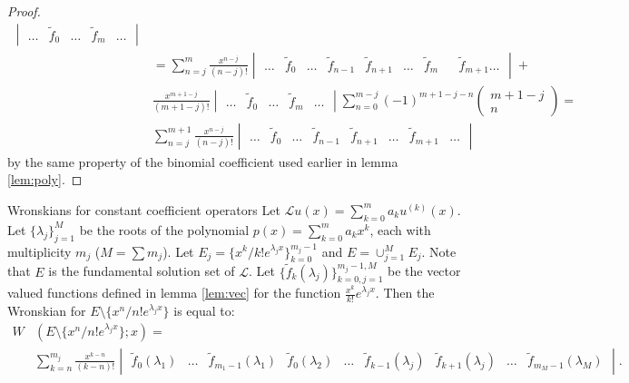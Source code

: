 \documentclass{book}
\begin{document}
\begin{proof}
\begin{align*}
\begin{vmatrix} \dots & \tilde{f}_0 & \dots & \tilde{f}_m & \dots \end{vmatrix} \\
& = \sum_{n=j}^m \frac{x^{n-j}}{(n-j)!} \begin{vmatrix} \dots & \tilde{f}_0 & \dots & \tilde{f}_{n-1} & \tilde{f}_{n+1} & \dots & \tilde{f}_m & & \tilde{f}_{m+1} \dots \end{vmatrix} + \\
& \frac{x^{m+1-j}}{(m+1-j)!}
\begin{vmatrix} \dots & \tilde{f}_0 & \dots & \tilde{f}_m & \dots \end{vmatrix}
\sum_{n=0}^{m-j} (-1)^{m+1-j-n} \begin{pmatrix} m+1-j \\ n \end{pmatrix} = \\
& \sum_{n=j}^{m+1} \frac{x^{n-j}}{(n-j)!} \begin{vmatrix} \dots & \tilde{f}_0 & \dots & \tilde{f}_{n-1} & \tilde{f}_{n+1} & \dots & \tilde{f}_{m+1} & \dots \end{vmatrix}
\end{align*}
by the same property of the binomial coefficient used earlier in lemma \ref{lem:poly}.
\end{proof}

\begin{thm}{Wronskians for constant coefficient operators}
Let $\mathcal{L} u(x) = \sum_{k=0}^m a_k u^{(k)}(x)$.
Let $\{ \lambda_j \}_{j=1}^M$ be the roots of the polynomial $p(x) = \sum_{k=0}^m a_k x^k$, each with multiplicity $m_j$ ($M = \sum m_j$).
Let $E_j = \{ x^k/k! e^{\lambda_j x} \}_{k=0}^{m_j-1}$ and $E = \cup_{j=1}^M E_j$.
Note that $E$ is the fundamental solution set of $\mathcal{L}$.
Let $\{ \tilde{f}_k(\lambda_j) \}_{k=0,j=1}^{m_j-1,M}$ be the vector valued functions defined in lemma \ref{lem:vec} for the function $\frac{x^k}{k!} e^{\lambda_j x}$.
Then the Wronskian for $E \setminus \{ x^n/n! e^{\lambda_j x} \}$ is equal to:
\begin{align*}
W & (E \setminus \{ x^n/n! e^{\lambda_j x} \} ; x) = \\
& \sum_{k=n}^{m_j} \frac{x^{k-n}}{(k-n)!} \begin{vmatrix} \tilde{f}_0(\lambda_1) & \dots & \tilde{f}_{m_1-1}(\lambda_1) & \tilde{f}_0(\lambda_2) & \dots
& \tilde{f}_{k-1}(\lambda_j) & \tilde{f}_{k+1}(\lambda_j) & \dots & \tilde{f}_{m_M-1}(\lambda_M) \end{vmatrix} .
\end{align*}
\label{thm:wcc}
\end{thm}
\end{document}
